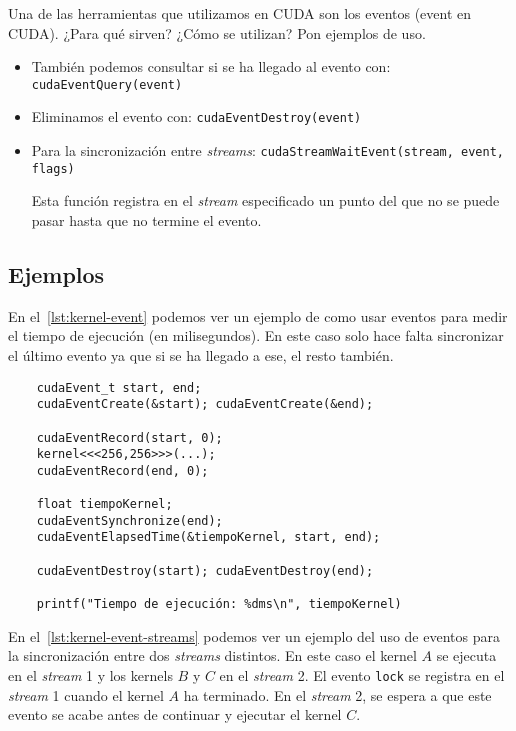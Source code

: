 \begin{pregunta}{Una de las herramientas que utilizamos en CUDA son los eventos (event en
CUDA). ¿Para qué sirven? ¿Cómo se utilizan? Pon ejemplos de uso.}
\begin{itemize}
        Esta función calcula el tiempo entre dos eventos y los almacena en la
        variable \texttt{t} (de tipo \texttt{float}).

    \item También podemos consultar si se ha llegado al evento con:
        \texttt{cudaEventQuery(event)}

    \item Eliminamos el evento con: \texttt{cudaEventDestroy(event)}

    \item Para la sincronización entre \emph{streams}:
        \texttt{cudaStreamWaitEvent(stream, event, flags)}

        Esta función registra en el \emph{stream} especificado un punto del que
        no se puede pasar hasta que no termine el evento.
\end{itemize}

\subsection*{Ejemplos}

En el~\cref{lst:kernel-event} podemos ver un ejemplo de como usar eventos para
medir el tiempo de ejecución (en milisegundos). En este caso solo hace falta sincronizar el
último evento ya que si se ha llegado a ese, el resto también.

\begin{listing}[H]
    \caption{Medir el tiempo de ejecución de un kernel con \emph{events}}
    \label{lst:kernel-event}
    \begin{verbatim}
    cudaEvent_t start, end;
    cudaEventCreate(&start); cudaEventCreate(&end);

    cudaEventRecord(start, 0);
    kernel<<<256,256>>>(...);
    cudaEventRecord(end, 0);

    float tiempoKernel;
    cudaEventSynchronize(end);
    cudaEventElapsedTime(&tiempoKernel, start, end);

    cudaEventDestroy(start); cudaEventDestroy(end);

    printf("Tiempo de ejecución: %dms\n", tiempoKernel)
    \end{verbatim}
\end{listing}

En el~\cref{lst:kernel-event-streams} podemos ver un ejemplo del uso de eventos
para la sincronización entre dos \emph{streams} distintos. En este caso el
kernel $A$ se ejecuta en el \emph{stream} 1 y los kernels $B$ y $C$ en el
\emph{stream} 2. El evento \texttt{lock} se registra en el \emph{stream} 1
cuando el kernel $A$ ha terminado. En el \emph{stream} 2, se espera a que este
evento se acabe antes de continuar y ejecutar el kernel $C$.


\end{pregunta}
